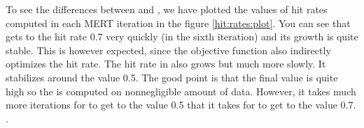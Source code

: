 To see the differences between  and
, we have plotted the values of hit rates computed in
each MERT iteration in the figure \ref{hit:rates:plot}. You can see that
 gets to the hit rate 0.7 very quickly (in the sixth
iteration) and its growth is quite stable. This is however expected, since the
objective function also indirectly optimizes the hit rate. The hit rate in
 also grows but much more slowly. It stabilizes around the
value 0.5. The good point is that the final value is quite high so the
 is computed on nonnegligible amount of data. However, it
takes much more iterations for  to get to the value 0.5 that
it takes for  to get to the value 0.7. .




